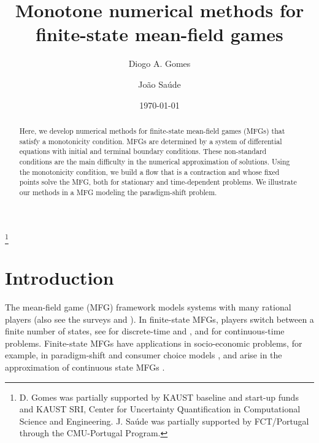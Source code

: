 \documentclass[12pt]{amsart}
\newcommand{\1}{{\chi}}
\theoremstyle{definition}
\begin{document}
\title[Monotone numerical methods for finite-state MFG]{Monotone numerical methods for finite-state mean-field games}

\author{Diogo A. Gomes}
\address[D. A. Gomes]{
        King Abdullah University of Science and Technology (KAUST), CEMSE Division, Thuwal 23955-6900. Saudi Arabia, and  
        KAUST SRI, Uncertainty Quantification Center in Computational Science and Engineering.}
\author{Jo\~ao Sa\'ude}
\address[J. Saude]{
        Carnegie Mellon University, Electrical and Computer Engineering department. 5000 Forbes Avenue Pittsburgh, PA 15213-3890 USA.}



\thanks{
        D. Gomes was partially supported by KAUST baseline and start-up funds and 
KAUST SRI, Center for Uncertainty Quantification in Computational Science and Engineering.  
        J. Sa\'ude was partially supported by FCT/Portugal through the CMU-Portugal Program.
}
\date{\today}
\begin{abstract}
        Here, we develop numerical methods for finite-state mean-field games (MFGs) that satisfy a monotonicity condition. 
    MFGs are determined by a system of differential equations with initial and terminal boundary conditions. 
    These non-standard conditions are the main difficulty in the numerical approximation of solutions. 
    Using the monotonicity condition, we build a flow that is a contraction and whose fixed points solve the MFG, both for stationary and time-dependent problems. We illustrate our methods in a MFG modeling the paradigm-shift problem. 
\end{abstract}
\maketitle
\section{Introduction} 
\label{sec:introduction}
        The mean-field game (MFG) framework \cite{Caines2, Caines1, ll1, ll2} models systems with many rational players (also see the surveys  \cite{GPV} and \cite{GS}). 
        In finite-state MFGs, players switch between a finite number of states, see \cite{GMS} for discrete-time and \cite{BHK, FG, GMS2, Gueant2}, and \cite{Gueant1} for continuous-time problems.
        Finite-state MFGs have applications in socio-economic problems, 
    for example, in paradigm-shift and consumer choice models \cite{BesancenotDogguy, GVW-dual,Gomes:2014kq}, and arise
     in the approximation of continuous state MFGs
     \cite{achdou2013finite, DY, AFG}.     
            
\end{document}
